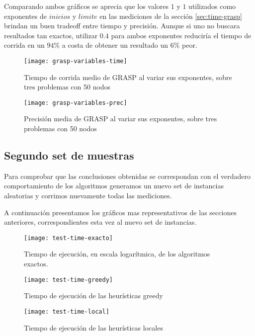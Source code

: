 Comparando ambos gráficos se aprecia que los valores $1$ y $1$ utilizados como exponentes de $inicios$ y $limite$ en las mediciones
de la sección \ref{sec:time-grasp} brindan un buen tradeoff entre tiempo y precisión. Aunque si uno no buscara resultados tan exactos,
utilizar $0.4$ para ambos exponentes reduciría el tiempo de corrida en un $94\%$ a costa de obtener un resultado un $6\%$ peor.

\begin{figure}[H]
    \centering
    \texttt{[image: grasp-variables-time]}
    \caption{Tiempo de corrida medio de GRASP al variar sus exponentes, sobre tres problemas con 50 nodos}
    \label{fig:grasp-variables-time}
\end{figure}

\begin{figure}[H]
    \centering
    \texttt{[image: grasp-variables-prec]}
    \caption{Precisión media de GRASP al variar sus exponentes, sobre tres problemas con 50 nodos}
    \label{fig:grasp-variables-prec}
\end{figure}

\subsection{Segundo set de muestras}

Para comprobar que las conclusiones obtenidas se correspondan con el verdadero comportamiento de los algoritmos
generamos un nuevo set de instancias aleatorias y corrimos nuevamente todas las mediciones.

A continuación presentamos los gráficos mas representativos de las secciones anteriores, correspondientes esta vez
al nuevo set de instancias.

\begin{figure}[H]
    \centering
    \texttt{[image: test-time-exacto]}
    \caption{Tiempo de ejecución, en escala logarítmica, de los algoritmos exactos.}
    \label{fig:test-time-exacto}
\end{figure}

\begin{figure}[H]
    \centering
    \texttt{[image: test-time-greedy]}
    \caption{Tiempo de ejecución de las heurísticas greedy}
    \label{fig:test-time-greedy}
\end{figure}

\begin{figure}[H]
    \centering
    \texttt{[image: test-time-local]}
    \caption{Tiempo de ejecución de las heurísticas locales}
    \label{fig:test-time-local}
\end{figure}

